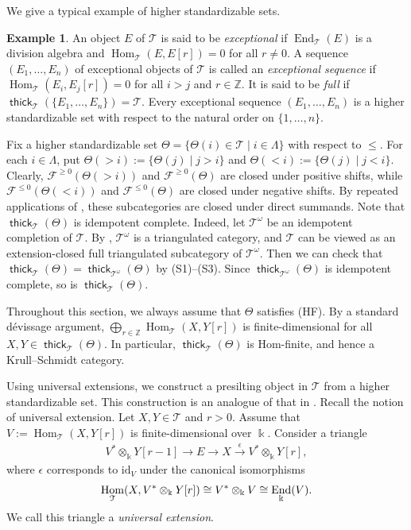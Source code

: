 \documentclass[a4paper,reqno,11pt]{amsart}
\numberwithin{equation}{section}
\theoremstyle{definition}
\newtheorem{example}[theorem]{Example}
\newcommand{\F}{\mathcal{F}}
\newcommand{\T}{\mathcal{T}}
\newcommand{\ZZ}{\mathbb{Z}}
\newcommand{\e}{\epsilon}
\newcommand{\bte}{\Theta}
\newcommand{\kk}{\Bbbk}
\newcommand{\xto}{\xrightarrow}
\newcommand{\id}{\mathrm{id}}
\DeclareMathOperator{\thick}{\mathsf{thick}}
\DeclareMathOperator{\End}{End}
\DeclareMathOperator{\Hom}{Hom}
\begin{document}
We give a typical example of higher standardizable sets.

\begin{example}\label{ex:exceptional}
An object $E$ of $\T$ is said to be \emph{exceptional} if $\End_{\T}(E)$ is a division algebra and $\Hom_{\T}(E,E[r])=0$ for all $r\neq 0$.
A sequence $(E_{1},\ldots,E_{n})$ of exceptional objects of $\T$ is called an \emph{exceptional sequence} if $\Hom_{\T}(E_{i},E_{j}[r])=0$ for all $i>j$ and $r\in\ZZ$.
It is said to be \emph{full} if $\thick_{\T}(\{E_{1},\ldots,E_{n}\})=\T$.
Every exceptional sequence $(E_{1},\ldots,E_{n})$ is a higher standardizable set with respect to the natural order on $\{1,\ldots,n\}$.
\end{example}

Fix a higher standardizable set $\bte=\{\bte(i)\in \T \mid i\in\Lambda\}$ with respect to $\leq$.
For each $i\in\Lambda$, put $\bte(>i):=\{\bte(j)\mid j>i\}$ and $\bte(<i):=\{\bte(j)\mid j<i\}$.
Clearly, $\F^{\geq 0}(\bte(>i))$ and $\F^{\geq 0}(\bte)$ are closed under positive shifts, while $\F^{\leq 0}(\bte(<i))$ and $\F^{\leq 0}(\bte)$ are closed under negative shifts.
By repeated applications of \cite[Lemma 2.6(a)]{IY18}, these subcategories are closed under direct summands.
Note that $\thick_{\T}(\bte)$ is idempotent complete.
Indeed, let $\T^{\omega}$ be an idempotent completion of $\T$. By \cite{BS01}, $\T^{\omega}$ is a triangulated category, and $\T$ can be viewed as an extension-closed full triangulated subcategory of $\T^{\omega}$. Then we can check that $\thick_{\T}(\bte)=\thick_{\T^{\omega}}(\bte)$ by (S1)--(S3). Since $\thick_{\T^{\omega}}(\bte)$ is idempotent complete, so is $\thick_{\T}(\bte)$.

Throughout this section, we always assume that $\bte$ satisfies (HF).
By a standard d\'evissage argument, $\bigoplus_{r\in\ZZ}\Hom_{\T}(X,Y[r])$ is finite-dimensional for all $X,Y\in\thick_{\T}(\bte)$.
In particular, $\thick_{\T}(\bte)$ is Hom-finite, and hence a Krull--Schmidt category.

Using universal extensions, we construct a presilting object in $\T$ from a higher standardizable set.
This construction is an analogue of that in \cite[Appendix A]{CC26}.
Recall the notion of universal extension.
Let $X,Y\in\T$ and $r>0$.
Assume that $V:=\Hom_{\T}(X,Y[r])$ is finite-dimensional over $\kk$.
Consider a triangle
\begin{align}\label{univ_tri}
V^{\ast}\otimes_{\kk}Y[r-1]\to E\to X \xto{\e}V^{\ast}\otimes_{\kk}Y[r],
\end{align}
where $\e$ corresponds to $\id_{V}$ under the canonical isomorphisms
\begin{align}
\Hom_{\T}(X,V^{\ast}\otimes_{\kk}Y[r]) \cong V^{\ast}\otimes_{\kk}V \cong\End_{\kk}(V).\notag
\end{align}
We call this triangle a \emph{universal extension}.
\end{document}
